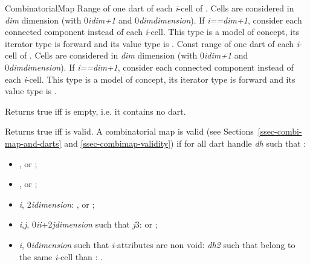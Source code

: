 \begin{ccRefConcept}{CombinatorialMap}
{Range of one dart of each \emph{i}-cell of .
  Cells are considered in \emph{dim} dimension  
  (with 0\myleq{}\emph{i}\myleq{}\emph{dim+1} and 0\myleq{}\emph{dim}\myleq{}\emph{dimension}). 
  If \emph{i==dim+1}, consider each connected component instead of each \emph{i}-cell. 
  This type is a model of  concept, its iterator type is forward and its value type is .}
\ccGlue
{}
{Const range of one dart of each \emph{i}-cell of .
  Cells are considered in \emph{dim} dimension 
  (with 0\myleq{}\emph{i}\myleq{}\emph{dim+1} and 0\myleq{}\emph{dim}\myleq{}\emph{dimension}). 
  If \emph{i==dim+1}, consider each connected component instead of each \emph{i}-cell. 
  This type is a model of  concept, its iterator type is forward and its value type is .}


 {Returns true iff  is empty,
  i.e. it contains no dart.}

         {Returns true iff  is valid.}
A combinatorial map  is valid (see Sections~\ref{ssec-combi-map-and-darts} and \ref{ssec-combimap-validity}) 
if for all dart handle \emph{dh} such that 
\myin{}:\\
\begin{itemize}
\item {}, or ;
\item {}, or ;
\item \myforall{}\emph{i}, 2\myleq{}\emph{i}\myleq{}\emph{dimension}: 
  , or ;
\item \myforall{}\emph{i},\emph{j}, 0\myleq{}\emph{i}\mylt{}\emph{i}+2\myleq{}\emph{j}\myleq{}\emph{dimension} 
  such that \emph{j}\mygeq{}3:  or
  ;
\item \myforall{}\emph{i}, 0\myleq{}\emph{i}\myleq{}\emph{dimension} such that \emph{i}-attributes are non void:
   \myforall{}\emph{dh2} such that  belong to the same \emph{i}-cell than :
   .
 \end{itemize}


\end{ccRefConcept}
